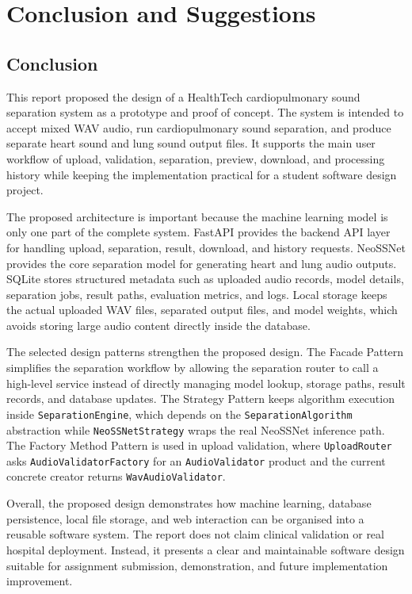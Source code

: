 \chapter{Conclusion and Suggestions}

\section{Conclusion}

This report proposed the design of a HealthTech cardiopulmonary sound separation system as a prototype and proof of concept. The system is intended to accept mixed WAV audio, run cardiopulmonary sound separation, and produce separate heart sound and lung sound output files. It supports the main user workflow of upload, validation, separation, preview, download, and processing history while keeping the implementation practical for a student software design project.

The proposed architecture is important because the machine learning model is only one part of the complete system. FastAPI provides the backend API layer for handling upload, separation, result, download, and history requests. NeoSSNet provides the core separation model for generating heart and lung audio outputs. SQLite stores structured metadata such as uploaded audio records, model details, separation jobs, result paths, evaluation metrics, and logs. Local storage keeps the actual uploaded WAV files, separated output files, and model weights, which avoids storing large audio content directly inside the database.

The selected design patterns strengthen the proposed design. The Facade Pattern simplifies the separation workflow by allowing the separation router to call a high-level service instead of directly managing model lookup, storage paths, result records, and database updates. The Strategy Pattern keeps algorithm execution inside \texttt{SeparationEngine}, which depends on the \texttt{SeparationAlgorithm} abstraction while \texttt{NeoSSNetStrategy} wraps the real NeoSSNet inference path. The Factory Method Pattern is used in upload validation, where \texttt{UploadRouter} asks \texttt{AudioValidatorFactory} for an \texttt{AudioValidator} product and the current concrete creator returns \texttt{WavAudioValidator}.

Overall, the proposed design demonstrates how machine learning, database persistence, local file storage, and web interaction can be organised into a reusable software system. The report does not claim clinical validation or real hospital deployment. Instead, it presents a clear and maintainable software design suitable for assignment submission, demonstration, and future implementation improvement.

